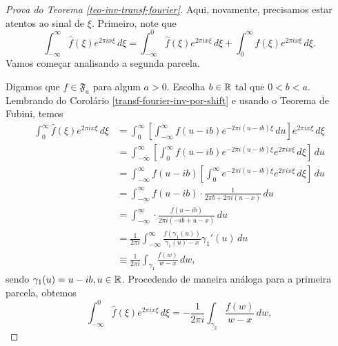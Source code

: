         \begin{proof}[Prova do Teorema \ref{teo-inv-transf-fourier}]
            Aqui, novamente, precisamos estar atentos ao sinal de $\xi$. Primeiro, note que
            \begin{equation*}
                \int_{-\infty}^{\infty} \widehat{f}(\xi) e^{2\pi ix\xi} \, d\xi 
                = \int_{-\infty}^{0} \widehat{f}(\xi) e^{2\pi ix\xi} \, d\xi 
                + \int_{0}^{\infty} \widehat{f}(\xi) e^{2\pi ix\xi} \, d\xi.
            \end{equation*}
            Vamos começar analisando a segunda parcela.
            
            Digamos que $f\in\mathfrak{F}_a$ para algum $a>0$. Escolha $b\in\mathbb{R}$ tal que $0 < b < a$.
            Lembrando do Corolário \ref{transf-fourier-inv-por-shift} e usando o Teorema de Fubini, temos
            \begin{align*}
                \int_{0}^{\infty} \widehat{f}(\xi) e^{2\pi ix\xi} \, d\xi
                &= \int_{0}^{\infty} \left[ \int_{-\infty}^{\infty} f(u-ib)e^{-2\pi i(u-ib)\xi} \, du \right] 
                    e^{2\pi ix\xi} \, d\xi \\
                &= \int_{-\infty}^{\infty} \left[ \int_{0}^{\infty} f(u-ib)e^{-2\pi i(u-ib)\xi}e^{2\pi ix\xi} \, d\xi
                    \right] \, du \\
                &= \int_{-\infty}^{\infty} f(u-ib) \left[ \int_{0}^{\infty} e^{-2\pi i(u-ib)\xi}e^{2\pi ix\xi} \, d\xi
                    \right] \, du \\
                &= \int_{-\infty}^{\infty} f(u-ib)\cdot\frac{1}{2\pi b + 2\pi i(u-x)} \, du \\
                &= \int_{-\infty}^{\infty} \cdot\frac{f(u-ib)}{2\pi i (-ib + u - x)} \, du \\
                &= \frac{1}{2\pi i} \int_{-\infty}^{\infty} \frac{f(\gamma_1(u))}{\gamma_1(u)-x}\gamma_1'(u) \, du \\
                &\equiv \frac{1}{2\pi i}\int_{\gamma_1} \frac{f(w)}{w-x} \, dw,
            \end{align*}
            sendo $\gamma_1(u) = u-ib, u\in\mathbb{R}$. Procedendo de maneira análoga para a primeira parcela, obtemos
            \begin{equation*}
                \int_{-\infty}^0 \widehat{f}(\xi) e^{2\pi ix\xi} \, d\xi 
                = -\frac{1}{2\pi i}\int_{\gamma_2} \frac{f(w)}{w-x} \, dw,
            \end{equation*}

\end{proof}
